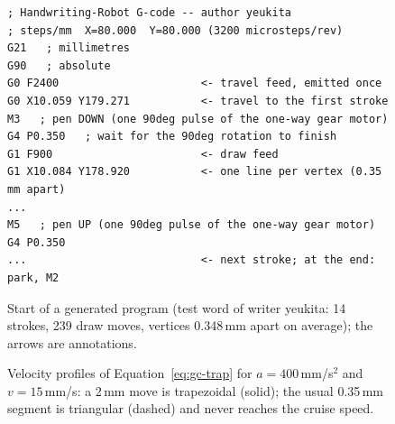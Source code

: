 \begin{figure}[!htbp]
\begin{lstlisting}[basicstyle=\ttfamily\footnotesize,frame=none]
; Handwriting-Robot G-code -- author yeukita
; steps/mm  X=80.000  Y=80.000 (3200 microsteps/rev)
G21   ; millimetres
G90   ; absolute
G0 F2400                      <- travel feed, emitted once
G0 X10.059 Y179.271           <- travel to the first stroke
M3   ; pen DOWN (one 90deg pulse of the one-way gear motor)
G4 P0.350   ; wait for the 90deg rotation to finish
G1 F900                       <- draw feed
G1 X10.084 Y178.920           <- one line per vertex (0.35 mm apart)
...
M5   ; pen UP (one 90deg pulse of the one-way gear motor)
G4 P0.350
...                           <- next stroke; at the end: park, M2
\end{lstlisting}
\caption{Start of a generated program (test word of writer yeukita: 14 strokes, 239 draw moves, vertices 0.348\,mm apart on average); the arrows are annotations.}
\label{fig:gc-excerpt}
\end{figure}

\begin{figure}[!htbp]
\centering
{}
\caption{Velocity profiles of Equation~\ref{eq:gc-trap} for $a=400$\,mm/s$^2$ and $v=15$\,mm/s: a 2\,mm move is trapezoidal (solid); the usual 0.35\,mm segment is triangular (dashed) and never reaches the cruise speed.}
\label{fig:gc-vel}
\end{figure}

